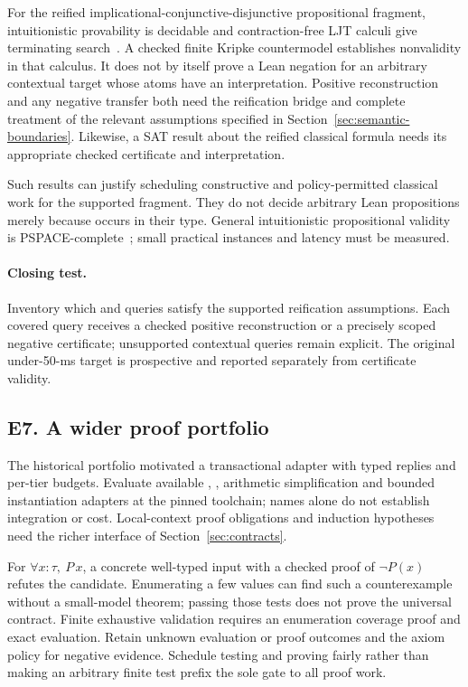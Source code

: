 For the reified implicational-conjunctive-disjunctive propositional fragment,
intuitionistic provability is decidable and contraction-free LJT calculi give
terminating search~\cite{dyckhoff92}. A checked finite Kripke countermodel
establishes nonvalidity in that calculus. It does not by itself prove a Lean
negation for an arbitrary contextual target whose atoms have an interpretation.
Positive reconstruction and any negative transfer both need the reification
bridge and complete treatment of the relevant assumptions specified in
Section~\ref{sec:semantic-boundaries}. Likewise, a SAT result about the reified
classical formula needs its appropriate checked certificate and interpretation.

Such results can justify scheduling constructive and policy-permitted
classical work for the supported fragment. They do not decide arbitrary Lean
propositions merely because  occurs in their type. General
intuitionistic propositional validity is PSPACE-complete~\cite{statman79};
small practical instances and latency must be measured.

\paragraph{Closing test.} Inventory which  and
 queries satisfy the supported reification assumptions.
Each covered query receives a checked positive reconstruction or a precisely
scoped negative certificate; unsupported contextual queries remain explicit.
The original under-50-ms target is prospective and reported separately from
certificate validity.

\subsection{E7. A wider proof portfolio}

The historical portfolio  motivated
a transactional adapter with typed replies and per-tier budgets. Evaluate
available , , arithmetic simplification and bounded
instantiation adapters at the pinned toolchain; names alone do not establish
integration or cost. Local-context proof obligations and induction hypotheses
need the richer interface of Section~\ref{sec:contracts}.

For $\forall x:\tau,\ P\,x$, a concrete well-typed input with a checked
proof of $\neg P(x)$ refutes the candidate. Enumerating a few values can find
such a counterexample without a small-model theorem; passing those tests does
not prove the universal contract. Finite exhaustive validation requires an
enumeration coverage proof and exact evaluation. Retain unknown evaluation or
proof outcomes and the axiom policy for negative evidence. Schedule testing
and proving fairly rather than making an arbitrary finite test prefix the
sole gate to all proof work.

